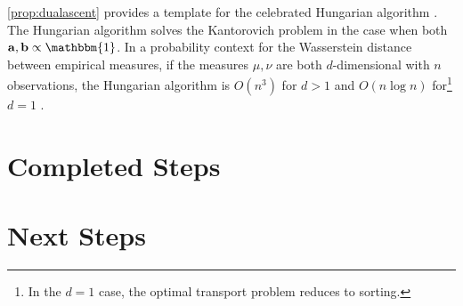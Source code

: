 \documentclass[11pt,reqno]{amsart}
\newcommand{\one}{\mathbbm{1}}
\renewcommand{\b}{\mathbf}
\theoremstyle{definition}
\theoremstyle{remark}
\begin{document}
\cref{prop:dualascent} provides a template for the celebrated Hungarian
algorithm \cite{kuhn2010hungarian}. The Hungarian algorithm solves the
Kantorovich problem in the case when both $\b a, \b b \propto \one$. In a
probability context for the Wasserstein distance between empirical measures,
if the measures $\mu, \nu$ are both $d$-dimensional with $n$ observations,
the Hungarian algorithm is $O(n^3)$ for $d>1$ and $O(n\log n)$
for\footnote{In the $d=1$ case, the optimal transport problem reduces to
sorting.} $d = 1$ \cite{bernton2017inference}.

\section{Completed Steps}


\section{Next Steps}


 



\end{document}
